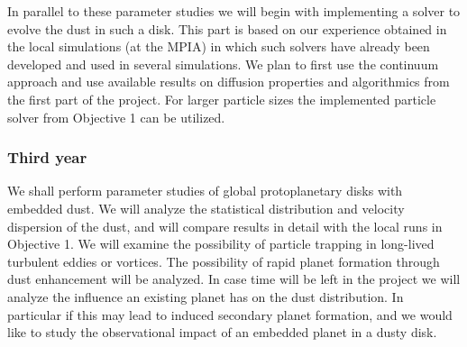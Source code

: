 In parallel to these parameter studies we will begin with implementing a
solver to evolve the dust in such a disk. This part is based on our
experience obtained in the local simulations (at the MPIA) in which such
solvers have already been developed and used in several simulations.  We
plan to first use the continuum approach and use available results on
diffusion properties and algorithmics from the first part of the project.
For larger particle sizes the implemented particle solver from Objective 1
can be utilized.
%
\subsubsection{Third year} 
We shall perform parameter studies of global protoplanetary disks with
embedded dust.  We will analyze the statistical distribution and velocity
dispersion of the dust, and will compare results in detail with the local
runs in Objective 1.  We will examine the possibility of particle trapping
in long-lived turbulent eddies or vortices.  The possibility of rapid planet
formation through dust enhancement will be analyzed.  In case time will be
left in the project we will analyze the influence an existing planet has on
the dust distribution. In particular if this may lead to induced secondary
planet formation, and we would like to study the observational impact of an
embedded planet in a dusty disk.
%
